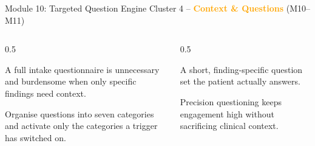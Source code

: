 \documentclass[9pt,aspectratio=169]{beamer}
\begin{document}
\begin{frame}{Module 10: Targeted Question Engine}
\textcolor{black!55}{\scriptsize Cluster 4 -- \textcolor{orange}{\textbf{Context \& Questions}} (M10--M11)}\\[2pt]
\begin{columns}[T,onlytextwidth]
\begin{column}{0.5\textwidth}
\begin{tcolorbox}[colback=blue!7,colframe=blue!55!black,title=\textbf{Motivation},boxrule=0.6pt,arc=1mm,left=5pt,right=5pt,top=3pt,bottom=3pt,fonttitle=\small]
\footnotesize A full intake questionnaire is unnecessary and burdensome when only specific findings need context.
\end{tcolorbox}
\vspace{5pt}
\begin{tcolorbox}[colback=teal!7,colframe=teal!55!black,title=\textbf{Method},boxrule=0.6pt,arc=1mm,left=5pt,right=5pt,top=3pt,bottom=3pt,fonttitle=\small]
\footnotesize Organise questions into seven categories and activate only the categories a trigger has switched on.
\end{tcolorbox}
\end{column}
\begin{column}{0.5\textwidth}
\begin{tcolorbox}[colback=green!8,colframe=green!45!black,title=\textbf{Result},boxrule=0.6pt,arc=1mm,left=5pt,right=5pt,top=3pt,bottom=3pt,fonttitle=\small]
\footnotesize A short, finding-specific question set the patient actually answers.
\end{tcolorbox}
\vspace{5pt}
\begin{tcolorbox}[colback=orange!10,colframe=orange!65!black,title=\textbf{Conclusion},boxrule=0.6pt,arc=1mm,left=5pt,right=5pt,top=3pt,bottom=3pt,fonttitle=\small]
\footnotesize Precision questioning keeps engagement high without sacrificing clinical context.
\end{tcolorbox}
\end{column}
\end{columns}
\end{frame}
\end{document}
